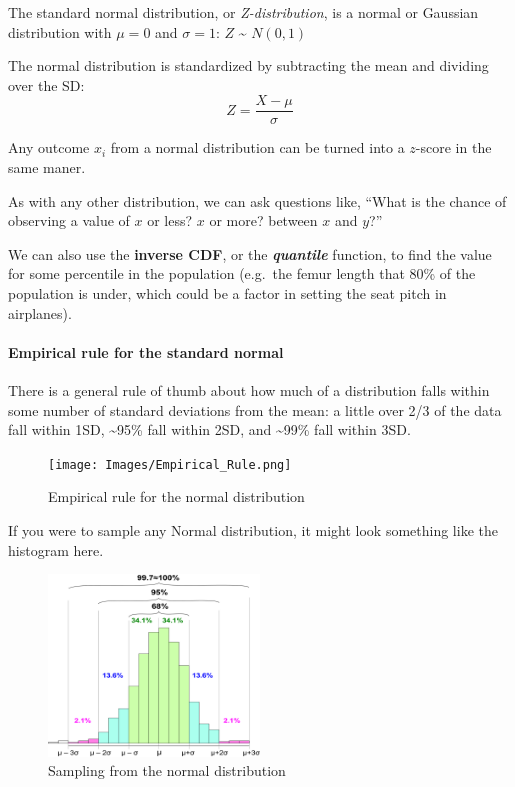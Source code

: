 \documentclass[
]{article}
\begin{document}
The standard normal distribution, or \emph{Z-distribution}, is a normal
or Gaussian distribution with \(\mu = 0\) and \(\sigma = 1\): \(Z\)
\textasciitilde{} \(N(0,1)\)

The normal distribution is standardized by subtracting the mean and
dividing over the SD: \[ Z = \frac{X - \mu}{\sigma}\]

Any outcome \(x_i\) from a normal distribution can be turned into a
\(z\)-score in the same maner.

As with any other distribution, we can ask questions like, ``What is the
chance of observing a value of \(x\) or less? \(x\) or more? between
\(x\) and \(y\)?''

We can also use the \textbf{inverse CDF}, or the
\textbf{\emph{quantile}} function, to find the value for some percentile
in the population (e.g.~the femur length that 80\% of the population is
under, which could be a factor in setting the seat pitch in airplanes).

\hypertarget{empirical-rule-for-the-standard-normal}{%
\paragraph{Empirical rule for the standard
normal}\label{empirical-rule-for-the-standard-normal}}

There is a general rule of thumb about how much of a distribution falls
within some number of standard deviations from the mean: a little over
2/3 of the data fall within 1SD, \textasciitilde95\% fall within 2SD,
and \textasciitilde99\% fall within 3SD.

\begin{figure}
\centering
\texttt{[image: Images/Empirical\_Rule.png]}
\caption{Empirical rule for the normal distribution}
\end{figure}

If you were to sample any Normal distribution, it might look something
like the histogram here.

\begin{figure}
\centering
\includegraphics[width=0.5\textwidth,height=\textheight]{Images/Empirical_Rule_Histogram.png}
\caption{Sampling from the normal distribution}
\end{figure}
\end{document}
